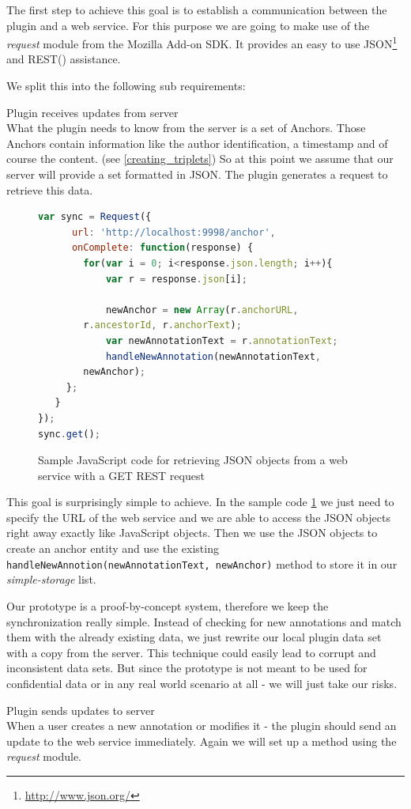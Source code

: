 The first step to achieve this goal is to establish a communication between the plugin and a web service. For this purpose we are going to make use of the \emph{request} module from the Mozilla Add-on SDK. It provides an easy to use JSON\footnote{\url{http://www.json.org/}} and REST(\cite{fielding2000principled}) assistance. 

We split this into the following sub requirements:
\begin{description}
\item Plugin receives updates from server\\
What the plugin needs to know from the server is a set of Anchors. Those Anchors contain information like the author identification, a timestamp and of course the content.
(see \ref{creating_triplets}) 
So at this point we assume that our server will provide a set formatted in JSON. The plugin generates a request to retrieve this data. 
\begin{figure}
\begin{lstlisting}[language=JavaScript]
var sync = Request({
      url: 'http://localhost:9998/anchor',
      onComplete: function(response) {
        for(var i = 0; i<response.json.length; i++){
            var r = response.json[i];

            newAnchor = new Array(r.anchorURL, 
		r.ancestorId, r.anchorText);
            var newAnnotationText = r.annotationText;
            handleNewAnnotation(newAnnotationText, 
		newAnchor);
     };
   }
});
sync.get();
\end{lstlisting}
\label{anchor_sample_code}
\caption{Sample JavaScript code for retrieving JSON objects from a web service with a GET REST request}
\end{figure}

This goal is surprisingly simple to achieve. In the sample code \ref{anchor_sample_code} we just need to specify the URL of the web service and we are able to access the JSON objects right away exactly like JavaScript objects. Then we use the JSON objects to create an anchor entity and use the existing \verb| handleNewAnnotion(newAnnotationText, newAnchor)| method to store it in our \emph{simple-storage} list. 

Our prototype is a proof-by-concept system, therefore we keep the synchronization really simple. Instead of checking for new annotations and match them with the already existing data, we just rewrite our local plugin data set with a copy from the server. This technique could easily lead to corrupt and inconsistent data sets. But since the prototype is not meant to be used for confidential data or in any real world scenario at all - we will just take our risks.

\item Plugin sends updates to server\\
When a user creates a new annotation or modifies it - the plugin should send an update to the web service immediately. Again we will set up a method using the \emph{request} module. 
\end{description}

